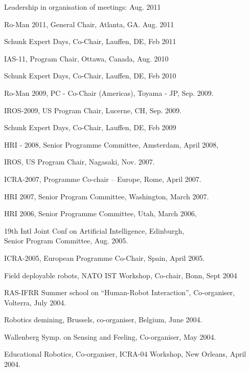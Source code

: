 \documentclass{article}
\begin{document}
\begin{cv}
\begin{cvlist}{Leadership in organisation of meetings:}
  Aug. 2011
\item Ro-Man 2011, General Chair, Atlanta, GA.
  \cftdotfill{\cftdotsep} Aug. 2011
\item Schunk Expert Days, Co-Chair, Lauffen, DE,
  \cftdotfill{\cftdotsep} Feb 2011
\item IAS-11, Program Chair, Ottawa, Canada, \cftdotfill{\cftdotsep}
  Aug. 2010
\item Schunk Expert Days, Co-Chair, Lauffen, DE,
  \cftdotfill{\cftdotsep} Feb 2010
\item Ro-Man 2009, PC - Co-Chair (Americas), Toyama - JP,
  \cftdotfill{\cftdotsep} Sep.  2009.
\item IROS-2009, US Program Chair, Lucerne, CH,
  \cftdotfill{\cftdotsep} Sep. 2009.
\item Schunk Expert Days, Co-Chair, Lauffen, DE,
  \cftdotfill{\cftdotsep} Feb 2009
\item HRI - 2008, Senior Programme Committee, Amsterdam,
  \cftdotfill{\cftdotsep} April 2008,
\item IROS, US Program Chair, Nagasaki, \cftdotfill{\cftdotsep}
  Nov. 2007.
\item ICRA-2007, Programme Co-chair -- Europe, Rome,
  \cftdotfill{\cftdotsep} April 2007.
\item HRI 2007, Senior Program Committee, Washington,
  \cftdotfill{\cftdotsep} March 2007.
\item HRI 2006, Senior Programme Committee, Utah,
  \cftdotfill{\cftdotsep} March 2006,
\item 19th Intl Joint Conf on Artificial Intelligence,
  Edinburgh,\\ Senior Program Committee, \cftdotfill{\cftdotsep}
  Aug. 2005.
\item ICRA-2005, European Programme Co-Chair, Spain,
  \cftdotfill{\cftdotsep} April 2005.
\item Field deployable robots, NATO IST Workshop, Co-chair, Bonn,
  \cftdotfill{\cftdotsep} Sept 2004
\item RAS-IFRR Summer school on ``Human-Robot Interaction'',
  Co-organiser, \\Volterra, \cftdotfill{\cftdotsep} July 2004.
\item Robotics demining, Brussels, co-organiser, Belgium,
  \cftdotfill{\cftdotsep} June 2004.
\item Wallenberg Symp. on Sensing and Feeling, Co-organiser,
  \cftdotfill{\cftdotsep} May 2004.
\item Educational Robotics, Co-organiser, ICRA-04 Workshop, New
  Orleans, \cftdotfill{\cftdotsep} April 2004.

\end{cvlist}
\end{cv}
\end{document}
